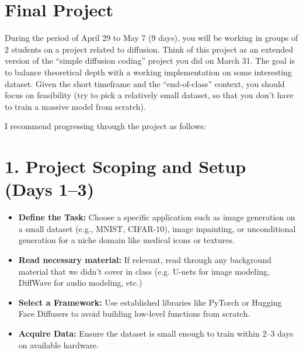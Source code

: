 \documentclass[letterpaper]{inzane_syllabus} %
\begin{document}
\section{Final Project}

During the period of April 29 to May 7 (9 days), you will be working in groups of 2 students on a project related to diffusion.    \alert{Think of this project as an extended version of the ``simple diffusion coding'' project you did on March 31.} The goal is to balance theoretical depth with a working implementation on some interesting dataset. Given the short timeframe and the ``end-of-class'' context, you should focus on feasibility (try to pick a relatively small dataset, so that you don't have to train a massive model from scratch). 

I recommend progressing through the project as follows:

\section{1. Project Scoping and Setup (Days 1--3)}
\begin{itemize}
    \item \textbf{Define the Task:} Choose a specific application such as image generation on a small dataset (e.g., MNIST, CIFAR-10), image inpainting, or unconditional generation for a niche domain like medical icons or textures.  
    \item \textbf{Read necessary material: } If relevant, read through any background material that we didn't cover in class (e.g. U-nets for image modeling, DiffWave for audio modeling, etc.)
    \item \textbf{Select a Framework:} Use established libraries like  PyTorch or Hugging Face Diffusers to avoid building low-level functions from scratch.
    \item \textbf{Acquire Data:} Ensure the dataset is small enough to train within 2--3 days on available hardware.
\end{itemize}
\end{document}
